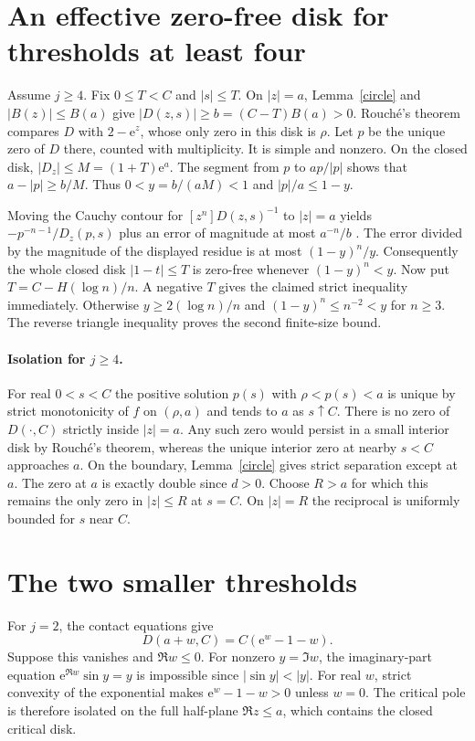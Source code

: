 \documentclass[11pt]{article}
\newcommand{\ee}{\mathrm e}
\begin{document}
\section{An effective zero-free disk for thresholds at least four}
Assume $j\ge4$. Fix $0\le T<C$ and $|s|\le T$. On $|z|=a$, Lemma~\ref{circle} and $|B(z)|\le B(a)$ give $|D(z,s)|\ge b=(C-T)B(a)>0$. Rouch\'e's theorem compares $D$ with $2-\ee^z$, whose only zero in this disk is $\rho$. Let $p$ be the unique zero of $D$ there, counted with multiplicity. It is simple and nonzero. On the closed disk, $|D_z|\le M=(1+T)\ee^a$. The segment from $p$ to $ap/|p|$ shows that $a-|p|\ge b/M$. Thus $0<y=b/(aM)<1$ and $|p|/a\le1-y$.

Moving the Cauchy contour for $[z^n]D(z,s)^{-1}$ to $|z|=a$ yields $-p^{-n-1}/D_z(p,s)$ plus an error of magnitude at most $a^{-n}/b$ \cite[Chap.~IV]{fs}. The error divided by the magnitude of the displayed residue is at most $(1-y)^n/y$. Consequently the whole closed disk $|1-t|\le T$ is zero-free whenever $(1-y)^n<y$. Now put $T=C-H(\log n)/n$. A negative $T$ gives the claimed strict inequality immediately. Otherwise $y\ge2(\log n)/n$ and $(1-y)^n\le n^{-2}<y$ for $n\ge3$. The reverse triangle inequality proves the second finite-size bound.

\paragraph{Isolation for $j\ge4$.}
For real $0<s<C$ the positive solution $p(s)$ with $\rho<p(s)<a$ is unique by strict monotonicity of $f$ on $(\rho,a)$ and tends to $a$ as $s\uparrow C$. There is no zero of $D(\cdot,C)$ strictly inside $|z|=a$. Any such zero would persist in a small interior disk by Rouch\'e's theorem, whereas the unique interior zero at nearby $s<C$ approaches $a$. On the boundary, Lemma~\ref{circle} gives strict separation except at $a$. The zero at $a$ is exactly double since $d>0$. Choose $R>a$ for which this remains the only zero in $|z|\le R$ at $s=C$. On $|z|=R$ the reciprocal is uniformly bounded for $s$ near $C$.

\section{The two smaller thresholds}\label{sec:small}
For $j=2$, the contact equations give
\[
 D(a+w,C)=C(\ee^w-1-w).
\]
Suppose this vanishes and $\Re w\le0$. For nonzero $y=\Im w$, the imaginary-part equation $\ee^{\Re w}\sin y=y$ is impossible since $|\sin y|<|y|$. For real $w$, strict convexity of the exponential makes $\ee^w-1-w>0$ unless $w=0$. The critical pole is therefore isolated on the full half-plane $\Re z\le a$, which contains the closed critical disk.
\end{document}
